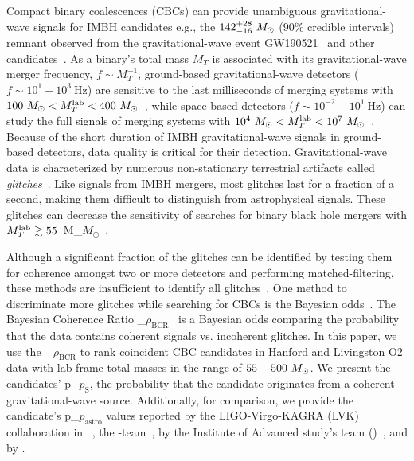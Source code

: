 \documentclass[
 nofootinbib,
 amsmath,amssymb,
 aps,
 twocolumn,
 superscriptaddress
]{revtex4-2}
\newcommand{\pycbc}{{\sc {{PyCBC}}}\xspace}
\newcommand{\GWTC}{{\sc {{GWTC-1}}}\xspace}
\newcommand{\IAS}{{\sc {{IAS}}}\xspace}
\newcommand{\fancytext}[1]{{\relax\ifmmode#1\else $#1$\fi}\xspace}
\newcommand{\mathcmd}[1]{{\sc \relax\ifmmode#1\else $#1$\fi}\xspace}
\newcommand{\bcr}{\mathcmd{\rho_\text{BCR}}}
\newcommand{\msun}{\mathcmd{M_\odot}}
\newcommand{\totMlab}{\mathcmd{M_T^{\rm{lab}}}}
\newcommand{\pastro}{\fancytext{p_\text{astro}}}
\newcommand{\pastrobcr}{\fancytext{p_\text{S}}}
\begin{document}
Compact binary coalescences (CBCs) can provide unambiguous gravitational-wave signals for IMBH candidates e.g., the ${142^{+28}_{-16}~\msun}$ ($90\%$ credible intervals) remnant observed from the gravitational-wave event GW190521~\cite{Abbott:2020:PhRvL} and other candidates~\cite{ligo_imbh_search, ligo_imbh_o3, pycbc_imbh}. As a binary's total mass $M_{T}$ is associated with its gravitational-wave merger frequency, $f\sim M_{T}^{-1}$,  ground-based gravitational-wave detectors (${f\sim 10^1 - 10^3\ \text{Hz}}$) are sensitive to the last milliseconds of merging systems with ${100~\msun < \totMlab < 400~\msun}$~\cite{LIGOScientificCollaboration:2015:CQGra, Martynov:2016:PhRvD, Moore_2014, Acernese:2015:CQGra}, while space-based detectors (${f \sim 10^{-2} - 10^1\ \text{Hz}}$) can study the full signals of merging systems with ${10^4~\msun < \totMlab < 10^7~\msun}$~\cite{ Moore_2014, Lu:2019:PhRvD}. Because of the short duration of IMBH gravitational-wave signals in ground-based detectors, data quality is critical for their detection. Gravitational-wave data is characterized by numerous non-stationary terrestrial artifacts called \textit{glitches}~\cite{ pycbc_short_duration_transients, pe_with_glitch, blip_glitches}. Like signals from IMBH mergers, most glitches last for a fraction of a second, making them difficult to distinguish from astrophysical signals. These glitches can decrease the sensitivity of searches for binary black hole mergers with $\totMlab\gtrsim55$~\msun ~\cite{pycbc_short_duration_transients}.

Although a significant fraction of the glitches can be identified by testing them for coherence amongst two or more detectors and performing matched-filtering, these methods are insufficient to identify all glitches~\cite{ pycbc_short_duration_transients, pe_with_glitch, blip_glitches}. One method to discriminate more glitches while searching for CBCs is the Bayesian odds~\cite{bci, kanner2016leveraging, BCR1, BCR2, bcr_gw151216, bayesian_odds}. The Bayesian Coherence Ratio \bcr~\cite{BCR1,BCR2} is a Bayesian odds comparing the probability that the data contains coherent signals vs. incoherent glitches. In this paper, we use the \bcr to rank coincident CBC candidates in Hanford and Livingston O2 data with lab-frame total masses in the range of $55-500~\msun$. We present the candidates' \pastrobcr, the probability that the candidate originates from a coherent gravitational-wave source. Additionally, for comparison, we provide the candidate's \pastro values reported by  the LIGO-Virgo-KAGRA (LVK) collaboration in \GWTC~\cite{GWTC1}, the \pycbc-team~\cite{pycbc_code, pycbc_og0, pycbc_og1, pycbc_og2, pycbc_og3, pycbc_og4, pycbc_og5, pycbc_og6, pycbc_single_det, pycbc_ogc_2}, by the Institute of Advanced study's team (\IAS)~\cite{IAS0, IAS1, IAS2}, and by \citet{bayesian_odds}. 
\end{document}
